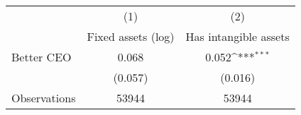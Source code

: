 {
\def\sym#1{\ifmmode^{#1}\else\(^{#1}\)\fi}
\begin{tabular}{l*{2}{c}}
\hline\hline
                    &\multicolumn{1}{c}{(1)}&\multicolumn{1}{c}{(2)}\\
                    &\multicolumn{1}{c}{Fixed assets (log)}&\multicolumn{1}{c}{Has intangible assets}\\
\hline
Better CEO          &       0.068         &       0.052\sym{***}\\
                    &     (0.057)         &     (0.016)         \\
\hline
Observations        &       53944         &       53944         \\
\hline\hline
\end{tabular}
}
